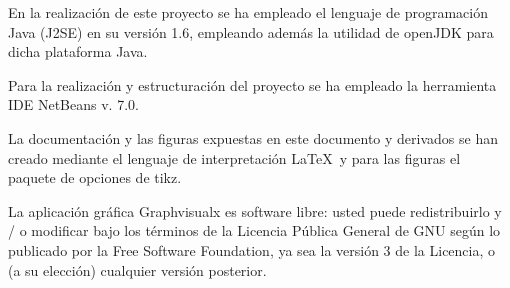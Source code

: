 \documentclass[xcolor=x11names,compress]{beamer}
\theoremstyle{cuadrado}
\begin{document}
{{En la realización de este proyecto se ha empleado el lenguaje de programación Java (J2SE) en su versión 1.6, empleando además la utilidad de openJDK para dicha plataforma Java.\newline

Para la realización y estructuración del proyecto se ha empleado la herramienta IDE NetBeans v. 7.0.\newline

La documentación y las figuras expuestas en este documento y derivados se han creado mediante el lenguaje de interpretación \LaTeX\ y para las figuras el paquete de opciones de tikz.\newline

La aplicación gráfica Graphvisualx es software libre: usted puede redistribuirlo y / o modificar bajo los términos de la Licencia Pública General de GNU según lo publicado por la Free Software Foundation, ya sea la versión 3 de la Licencia, o (a su elección) cualquier versión posterior.\\


}

}
\end{document}
